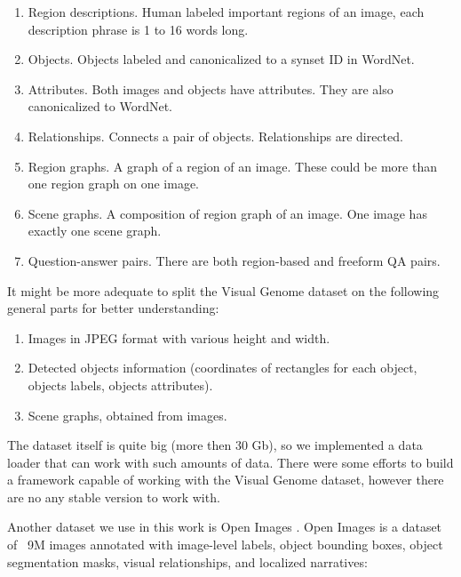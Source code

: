 \begin{enumerate}
    \item Region descriptions. Human labeled important regions of an image, each description phrase is 1 to 16 words long.
    \item Objects. Objects labeled and canonicalized to a synset ID in WordNet.
    \item Attributes. Both images and objects have attributes. They are also canonicalized to WordNet.
    \item Relationships. Connects a pair of objects. Relationships are directed.
    \item Region graphs. A graph of a region of an image. These could be more than one region graph on one image.
    \item Scene graphs. A composition of region graph of an image. One image has exactly one scene graph.
    \item Question-answer pairs. There are both region-based and freeform QA pairs.
\end{enumerate}

It might be more adequate to split the Visual Genome dataset on the following general parts for better understanding:

\begin{enumerate}
    \item Images in JPEG format with various height and width.
    \item Detected objects information (coordinates of rectangles for each object, objects labels, objects attributes).
    \item Scene graphs, obtained from images.
\end{enumerate}

The dataset itself is quite big (more then 30 Gb), so we implemented a data loader that can work with such amounts of data. There were some efforts \cite{Yang_2018_Graph} to build a framework capable of working with the Visual Genome dataset, however there are no any stable version to work with.

Another dataset we use in this work is Open Images \cite{OpenImages2}. Open Images is a dataset of ~9M images annotated with image-level labels, object bounding boxes, object segmentation masks, visual relationships, and localized narratives:

